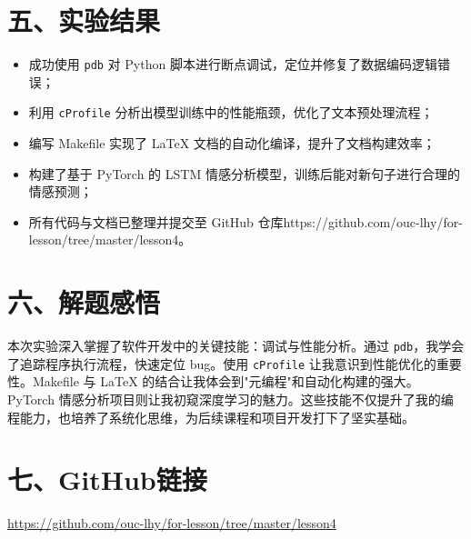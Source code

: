 \documentclass[a4paper, 12pt]{article}
\begin{document}
\section*{五、实验结果}
\begin{itemize}
    \item 成功使用 \texttt{pdb} 对 Python 脚本进行断点调试，定位并修复了数据编码逻辑错误；
    \item 利用 \texttt{cProfile} 分析出模型训练中的性能瓶颈，优化了文本预处理流程；
    \item 编写 Makefile 实现了 LaTeX 文档的自动化编译，提升了文档构建效率；
    \item 构建了基于 PyTorch 的 LSTM 情感分析模型，训练后能对新句子进行合理的情感预测；
    \item 所有代码与文档已整理并提交至 GitHub 仓库https://github.com/ouc-lhy/for-lesson/tree/master/lesson4。
\end{itemize}

\section*{六、解题感悟}
本次实验深入掌握了软件开发中的关键技能：调试与性能分析。通过 \texttt{pdb}，我学会了追踪程序执行流程，快速定位 bug。使用 \texttt{cProfile} 让我意识到性能优化的重要性。Makefile 与 LaTeX 的结合让我体会到"元编程"和自动化构建的强大。PyTorch 情感分析项目则让我初窥深度学习的魅力。这些技能不仅提升了我的编程能力，也培养了系统化思维，为后续课程和项目开发打下了坚实基础。

\section*{七、GitHub链接}
\url{https://github.com/ouc-lhy/for-lesson/tree/master/lesson4}
\end{document}
